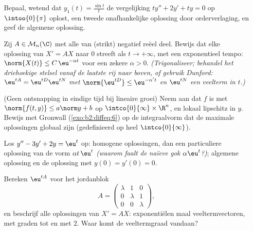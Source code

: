 \begin{exercise}[$\star\star$]\label{exo:b2:diffeq:7}
Bepaal, wetend dat $y_1(t) = \frac{\sin t}{t}$ de vergelijking
$ty'' + 2y' + ty = 0$ op $\intoo{0}{\pi}$ oplost, een tweede
onafhankelijke oplossing door orderverlaging, en geef de algemene
oplossing.
\end{exercise}

\begin{exercise}[$\star\star\star$]\label{exo:b2:diffeq:8}
Zij $A \in \mathcal{M}_n(\C)$ met alle  van (strikt)
negatief reëel deel. Bewijs dat elke oplossing van $X' = AX$ naar
$0$ streeft als $t \to +\infty$, met een exponentieel tempo:
$\norm{X(t)} \leq C\,\eu^{-\alpha t}$ voor een zekere $\alpha > 0$.
\emph{(Trigonaliseer; behandel het driehoekige stelsel vanaf de
laatste rij naar boven, of gebruik Dunford: $\eu^{tA} =
\eu^{tD}\eu^{tN}$ met $\norm{\eu^{tD}} \leq \eu^{-\alpha' t}$ en
$\eu^{tN}$ een veelterm in $t$.)}
\end{exercise}

\begin{exercise}[$\star\star\star$]\label{exo:b2:diffeq:9}
(Geen ontsnapping in eindige tijd bij lineaire groei) Neem aan dat
$f$  is met $\norm{f(t, y)} \leq a\norm y + b$ op
$\intco{0}{\infty} \times \R^n$, en lokaal lipschitz in $y$. Bewijs
met Gronwall (\cref{exo:b2:diffeq:6}) op de integraalvorm dat de
maximale oplossingen globaal zijn (gedefinieerd op heel
$\intco{0}{\infty}$).
\end{exercise}

\begin{exercise}[$\star$]\label{exo:b2:diffeq:10}
Los $y'' - 3y' + 2y = \eu^{t}$ op: homogene oplossingen, dan een
particuliere oplossing van de vorm $\alpha t\,\eu^{t}$ \emph{(waarom
faalt de naïeve gok $\alpha\eu^t$?)}; algemene oplossing en de
oplossing met $y(0) = y'(0) = 0$.
\end{exercise}

\begin{exercise}[$\star\star$]\label{exo:b2:diffeq:11}
Bereken $\eu^{tA}$ voor het jordanblok
\[
A = \begin{pmatrix} \lambda & 1 & 0\\ 0 & \lambda & 1\\
0 & 0 & \lambda\end{pmatrix},
\]
en beschrijf alle oplossingen van $X' = AX$: exponentiëlen maal
veeltermvectoren, met graden tot en met $2$. Waar komt de
veeltermgraad vandaan?
\end{exercise}

